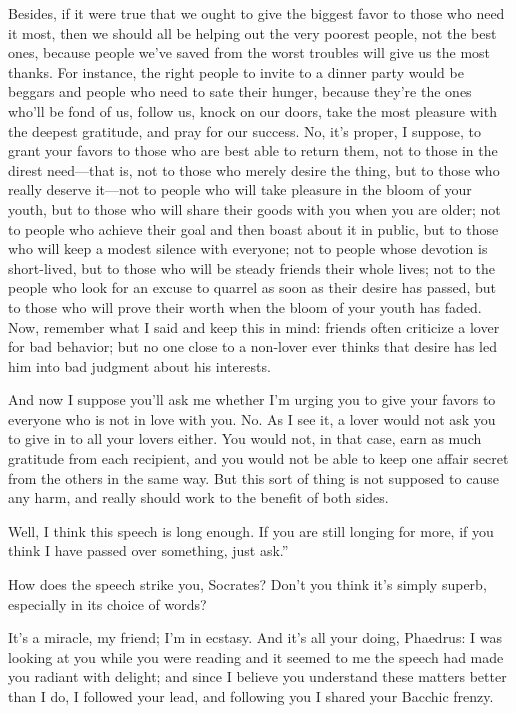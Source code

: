 Besides, if it were true that we ought to give the biggest favor to
those who need it most, then we should all be helping out the very
poorest people, not the best ones, because people we’ve saved from the
worst troubles will give us the most thanks. For instance, the right
people to invite to a dinner party would be beggars and people
who need to sate their hunger, because they’re the ones who’ll be fond
of us, follow us, knock on our
doors, take the most
pleasure with the deepest gratitude, and pray for our success. No, it’s
proper, I suppose, to grant your favors to those who are best able to
return them, not to those in the direst need---that is, not to those who
merely desire the thing, but to those who really deserve
it---not to people who will take pleasure in the bloom of your youth,
but to those who will share their goods with you when you are older; not
to people who achieve their goal and then boast about it in public, but
to those who will keep a modest silence with everyone; not to people
whose devotion is short-lived, but to those who will be steady friends
their whole lives; not to the people who look for an excuse to quarrel
as soon as their desire has passed, but to those who will prove 
their worth when the bloom of your youth has faded. Now, remember what I
said and keep this in mind: friends often criticize a lover for bad
behavior; but no one close to a non-lover ever thinks that desire has
led him into bad judgment about his interests.

And now I suppose you’ll ask me whether I’m urging you to give your
favors to everyone who is not in love with you. No. As I see it, a lover
would not ask you to give in to all your lovers either. You would not,
in that case, earn as much gratitude from each recipient, and
you would not be able to keep one affair secret from the others in the
same way. But this sort of thing is not supposed to cause any harm, and
really should work to the benefit of both sides.

Well, I think this speech is long enough. If you are still longing for
more, if you think I have passed over something, just ask.”

How does the speech strike you, Socrates? Don’t you think it’s simply
superb, especially in its choice of words?

\saysocrates It’s a miracle, my friend; I’m in ecstasy. And it’s all your 
doing, Phaedrus: I was looking at you while you were reading and
it seemed to me the speech had made you radiant with delight; and since
I believe you understand these matters better than I do, I followed your
lead, and following you I shared your Bacchic frenzy.

